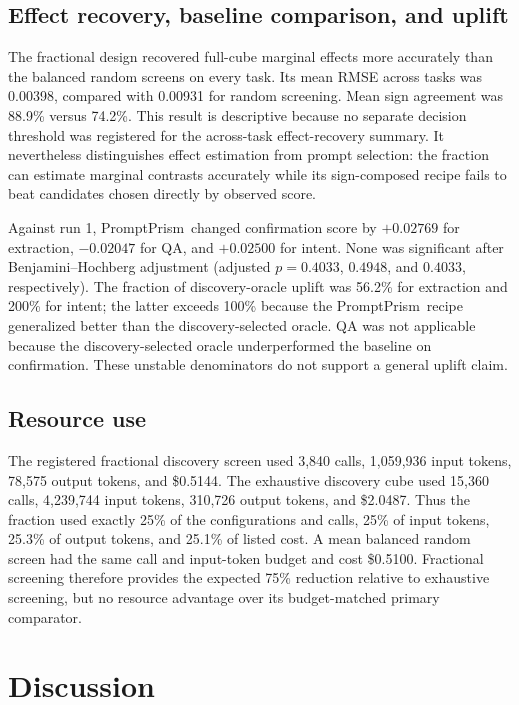 \documentclass[11pt,a4paper]{article}
\newcommand{\method}{PromptPrism}
\begin{document}
\subsection{Effect recovery, baseline comparison, and uplift}



The fractional design recovered full-cube marginal effects more accurately than the balanced random screens on every task. Its mean RMSE across tasks was 0.00398, compared with 0.00931 for random screening. Mean sign agreement was 88.9\% versus 74.2\%. This result is descriptive because no separate decision threshold was registered for the across-task effect-recovery summary. It nevertheless distinguishes effect estimation from prompt selection: the fraction can estimate marginal contrasts accurately while its sign-composed recipe fails to beat candidates chosen directly by observed score.

Against run 1, \method\ changed confirmation score by $+0.02769$ for extraction, $-0.02047$ for QA, and $+0.02500$ for intent. None was significant after Benjamini--Hochberg adjustment (adjusted $p=0.4033$, $0.4948$, and $0.4033$, respectively). The fraction of discovery-oracle uplift was 56.2\% for extraction and 200\% for intent; the latter exceeds 100\% because the \method\ recipe generalized better than the discovery-selected oracle. QA was not applicable because the discovery-selected oracle underperformed the baseline on confirmation. These unstable denominators do not support a general uplift claim.

\subsection{Resource use}

The registered fractional discovery screen used 3,840 calls, 1,059,936 input tokens, 78,575 output tokens, and \$0.5144. The exhaustive discovery cube used 15,360 calls, 4,239,744 input tokens, 310,726 output tokens, and \$2.0487. Thus the fraction used exactly 25\% of the configurations and calls, 25\% of input tokens, 25.3\% of output tokens, and 25.1\% of listed cost. A mean balanced random screen had the same call and input-token budget and cost \$0.5100. Fractional screening therefore provides the expected 75\% reduction relative to exhaustive screening, but no resource advantage over its budget-matched primary comparator.

\section{Discussion}
\end{document}
